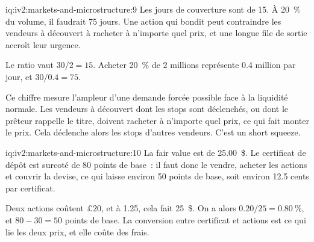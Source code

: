 \begin{solution}{iq:iv2:markets-and-microstructure:9}
Les jours de couverture sont de 15. À 20~\% du volume, il faudrait 75 jours. Une action qui bondit peut contraindre les vendeurs à découvert à racheter à n'importe quel prix, et une longue file de sortie accroît leur urgence.

Le ratio vaut $30/2 = 15$. Acheter 20~\% de 2 millions représente 0.4 million par jour, et $30/0.4 = 75$.

Ce chiffre mesure l'ampleur d'une demande forcée possible face à la liquidité normale. Les vendeurs à découvert dont les stops sont déclenchés, ou dont le prêteur rappelle le titre, doivent racheter à n'importe quel prix, ce qui fait monter le prix. Cela déclenche alors les stops d'autres vendeurs. C'est un short squeeze.

\end{solution}

\begin{solution}{iq:iv2:markets-and-microstructure:10}
La fair value est de 25.00~\$. Le certificat de dépôt est surcoté de 80 points de base~: il faut donc le vendre, acheter les actions et couvrir la devise, ce qui laisse environ 50 points de base, soit environ 12.5 cents par certificat.

Deux actions coûtent $\pounds 20$, et à 1.25, cela fait 25~\$. On a alors $0.20/25 = 0.80~\%$, et $80 - 30 = 50$ points de base. La conversion entre certificat et actions est ce qui lie les deux prix, et elle coûte des frais.

\end{solution}

